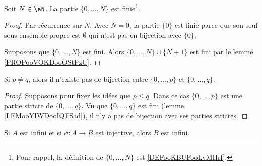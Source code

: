 \begin{lemma}       \label{LEMooYIWDooIQFSad}
    Soit \( N\in \eN\). La partie \( \{ 0,\ldots, N \}\) est finie\footnote{Pour rappel, la définition de \( \{ 0,\ldots, N \}\) est \ref{DEFooKBUFooLvMHrf}.}.
\end{lemma}

\begin{proof}
    Par récurrence sur \( N\). Avec \( N=0\), la partie \( \{ 0 \}\) est finie parce que son seul sous-ensemble propre est \( \emptyset\) qui n'est pas en bijection avec \( \{ 0 \}\).

    Supposons que \( \{ 0,\ldots, N \}\) est fini. Alors \( \{ 0,\ldots, N \}\cup \{ N+1 \}\) est fini par le lemme \ref{PROPooVOKDooOStPzU}.
\end{proof}

\begin{lemma}       \label{LEMooJDGOooHdyJnu}
    Si \( p\neq q\), alors il n'existe pas de bijection entre \( \{ 0,\ldots, p \}\) et \( \{ 0,\ldots, q \}\).
\end{lemma}

\begin{proof}
    Supposons pour fixer les idées que \( p\leq q\). Dans ce cas \( \{ 0,\ldots, p \}\) est une partie stricte de \( \{ 0,\ldots, q \}\). Vu que \( \{ 0,\ldots, q \}\) est fini (lemme \ref{LEMooYIWDooIQFSad}), il n'y a pas de bijection avec ses parties strictes.
\end{proof}

\begin{proposition}    \label{PROPooWKSIooHcfYPN}
    Si \( A\) est infini et si \( \sigma\colon A\to B\) est injective, alors \( B\) est infini.
\end{proposition}


